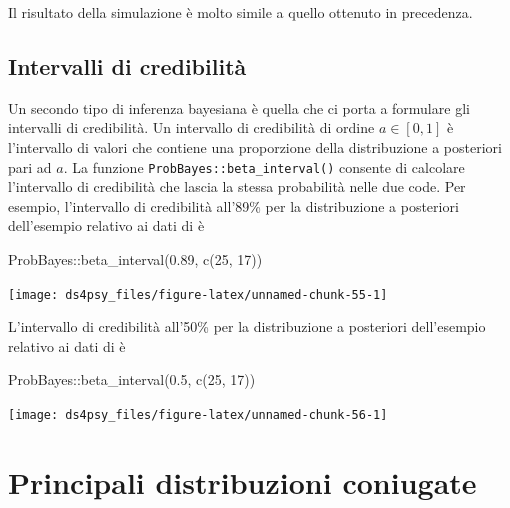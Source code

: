 \documentclass[
  11pt,
]{krantz}
\makeatletter
\newenvironment{Shaded}{\begin{snugshade}}{\end{snugshade}}
\newcommand{\DecValTok}[1]{\textcolor[rgb]{0.06,0.06,0.06}{#1}}
\newcommand{\FloatTok}[1]{\textcolor[rgb]{0.06,0.06,0.06}{#1}}
\newcommand{\FunctionTok}[1]{\textcolor[rgb]{0,0,0}{#1}}
\newcommand{\NormalTok}[1]{#1}
\newcommand{\SpecialCharTok}[1]{\textcolor[rgb]{0,0,0}{#1}}
\newenvironment{kframe}{%
\medskip{}
\setlength{\fboxsep}{.8em}
 \def\at@end@of@kframe{}%
 \ifinner\ifhmode%
  \def\at@end@of@kframe{\end{minipage}}%
  \begin{minipage}{\columnwidth}%
 \fi\fi%
 \def\FrameCommand##1{\hskip\@totalleftmargin \hskip-\fboxsep
 \colorbox{shadecolor}{##1}\hskip-\fboxsep
     \hskip-\linewidth \hskip-\@totalleftmargin \hskip\columnwidth}%
 \MakeFramed {\advance\hsize-\width
   \@totalleftmargin\z@ \linewidth\hsize
   \@setminipage}}%
 {\par\unskip\endMakeFramed%
 \at@end@of@kframe}
\renewenvironment{Shaded}{\begin{kframe}}{\end{kframe}}
\theoremstyle{definition}
\theoremstyle{definition}
\theoremstyle{definition}
\theoremstyle{definition}
\theoremstyle{remark}
\makeatother
\begin{document}
Il risultato della simulazione è molto simile a quello ottenuto in precedenza.

\hypertarget{intervalli-di-credibilituxe0}{%
\subsection{Intervalli di credibilità}\label{intervalli-di-credibilituxe0}}

Un secondo tipo di inferenza bayesiana è quella che ci porta a formulare gli intervalli di credibilità. Un intervallo di credibilità di ordine \(a \in [0, 1]\) è l'intervallo di valori che contiene una proporzione della distribuzione a posteriori pari ad \(a\). La funzione \texttt{ProbBayes::beta\_interval()} consente di calcolare l'intervallo di credibilità che lascia la stessa probabilità nelle due code. Per esempio, l'intervallo di credibilità all'89\% per la distribuzione a posteriori dell'esempio relativo ai dati di \citet{zetschefuture2019} è

\begin{Shaded}
\begin{Highlighting}[]
\NormalTok{ProbBayes}\SpecialCharTok{::}\FunctionTok{beta\_interval}\NormalTok{(}\FloatTok{0.89}\NormalTok{, }\FunctionTok{c}\NormalTok{(}\DecValTok{25}\NormalTok{, }\DecValTok{17}\NormalTok{))}
\end{Highlighting}
\end{Shaded}

\begin{center}\texttt{[image: ds4psy\_files/figure-latex/unnamed-chunk-55-1]} \end{center}

L'intervallo di credibilità all'50\% per la distribuzione a posteriori dell'esempio relativo ai dati di \citet{zetschefuture2019} è

\begin{Shaded}
\begin{Highlighting}[]
\NormalTok{ProbBayes}\SpecialCharTok{::}\FunctionTok{beta\_interval}\NormalTok{(}\FloatTok{0.5}\NormalTok{, }\FunctionTok{c}\NormalTok{(}\DecValTok{25}\NormalTok{, }\DecValTok{17}\NormalTok{))}
\end{Highlighting}
\end{Shaded}

\begin{center}\texttt{[image: ds4psy\_files/figure-latex/unnamed-chunk-56-1]} \end{center}

\hypertarget{principali-distribuzioni-coniugate}{%
\section{Principali distribuzioni coniugate}\label{principali-distribuzioni-coniugate}}
\end{document}

